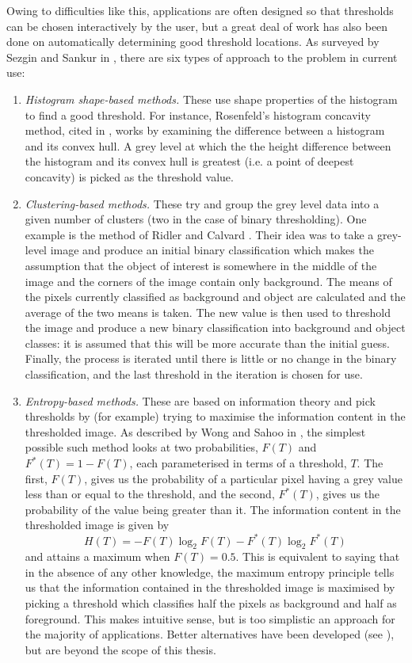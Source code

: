 Owing to difficulties like this, applications are often designed so that thresholds can be chosen interactively by the user, but a great deal of work has also been done on automatically determining good threshold locations. As surveyed by Sezgin and Sankur in \cite{sezgin04}, there are six types of approach to the problem in current use:

\begin{enumerate}

\item \emph{Histogram shape-based methods.} These use shape properties of the histogram to find a good threshold. For instance, Rosenfeld's histogram concavity method, cited in \cite{lee.c92}, works by examining the difference between a histogram and its convex hull. A grey level at which the the height difference between the histogram and its convex hull is greatest (i.e. a point of deepest concavity) is picked as the threshold value.

\item \emph{Clustering-based methods.} These try and group the grey level data into a given number of clusters (two in the case of binary thresholding). One example is the method of Ridler and Calvard \cite{ridler78}. Their idea was to take a grey-level image and produce an initial binary classification which makes the assumption that the object of interest is somewhere in the middle of the image and the corners of the image contain only background. The means of the pixels currently classified as background and object are calculated and the average of the two means is taken. The new value is then used to threshold the image and produce a new binary classification into background and object classes: it is assumed that this will be more accurate than the initial guess. Finally, the process is iterated until there is little or no change in the binary classification, and the last threshold in the iteration is chosen for use.

\item \emph{Entropy-based methods.} These are based on information theory and pick thresholds by (for example) trying to maximise the information content in the thresholded image. As described by Wong and Sahoo in \cite{wong89}, the simplest possible such method looks at two probabilities, $F(T)$ and $F^*(T) = 1 - F(T)$, each parameterised in terms of a threshold, $T$. The first, $F(T)$, gives us the probability of a particular pixel having a grey value less than or equal to the threshold, and the second, $F^*(T)$, gives us the probability of the value being greater than it. The information content in the thresholded image is given by
%
\[
H(T) = -F(T) \log_2 F(T) - F^*(T) \log_2 F^*(T)
\]
%
and attains a maximum when $F(T) = 0.5$. This is equivalent to saying that in the absence of any other knowledge, the maximum entropy principle tells us that the information contained in the thresholded image is maximised by picking a threshold which classifies half the pixels as background and half as foreground. This makes intuitive sense, but is too simplistic an approach for the majority of applications. Better alternatives have been developed (see \cite{sezgin04}), but are beyond the scope of this thesis.


\end{enumerate}

